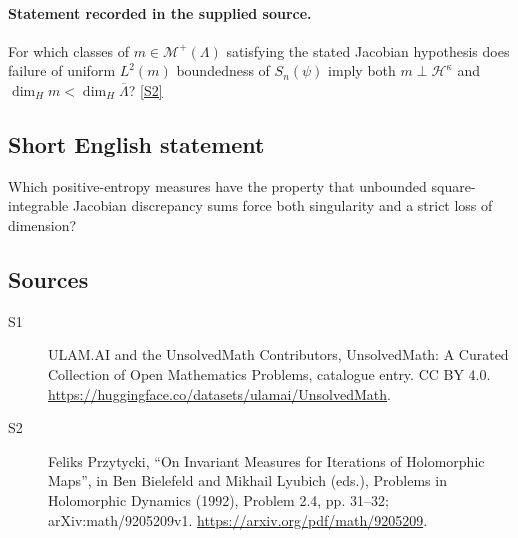 \documentclass[11pt]{article}
\newcommand{\sref}[2]{\hyperlink{source:#1:#2}{[S#2]}}
\begin{document}
\paragraph{Statement recorded in the supplied source.}
For which classes of $m\in\mathcal M^+(\Lambda)$ satisfying the stated Jacobian hypothesis does failure of uniform $L^2(m)$ boundedness of $S_n(\psi)$ imply both $m\perp\mathcal H^\kappa$ and $\dim_Hm<\dim_H\overline\Lambda$? \sref{statement}{2}
\subsection{Short English statement}
Which positive-entropy measures have the property that unbounded square-integrable Jacobian discrepancy sums force both singularity and a strict loss of dimension?
\subsection{Sources}
\begin{description}
\item[\hypertarget{source:statement:1}{S1}] ULAM.AI and the UnsolvedMath Contributors, UnsolvedMath: A Curated Collection of Open Mathematics Problems, catalogue entry. CC BY 4.0. \url{https://huggingface.co/datasets/ulamai/UnsolvedMath}.
\item[\hypertarget{source:statement:2}{S2}] Feliks Przytycki, ``On Invariant Measures for Iterations of Holomorphic Maps'', in Ben Bielefeld and Mikhail Lyubich (eds.), Problems in Holomorphic Dynamics (1992), Problem 2.4, pp. 31--32; arXiv:math/9205209v1. \url{https://arxiv.org/pdf/math/9205209}.
\end{description}
\label{end:statement}
\end{document}
